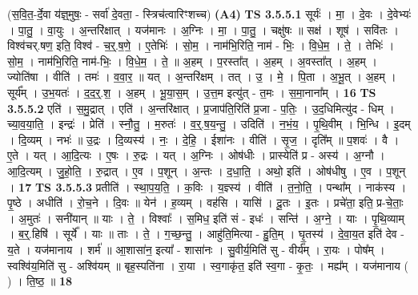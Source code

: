 \documentclass[17pt]{extarticle}
\begin{document}
                  \newline
                      (स॒वि॒त॒-र्दे॒वा य॑ज्ञ्॒मुषः॒ - सर्वा॑ दे॒वता॒ - स्त्रिच॑त्वारिꣳशच्च)  \textbf{(A4)} \newline \newline
                                \textbf{ TS 3.5.5.1} \newline
                  सूर्यः॑ । मा॒ । दे॒वः । दे॒वेभ्यः॑ । पा॒तु॒ । वा॒युः । अ॒न्तरि॑क्षात् । यज॑मानः । अ॒ग्निः । मा॒ । पा॒तु॒ । चक्षु॑षः ॥ सक्ष॑ । शूष॑ । सवि॑तः । विश्व॑चर्.षण॒ इति॒ विश्व॑ - च॒र्॒.ष॒णे॒ । ए॒तेभिः॑ । सो॒म॒ । नाम॑भि॒रिति॒ नाम॑ - भिः॒ । वि॒धे॒म॒ । ते॒ । तेभिः॑ । सो॒म॒ । नाम॑भि॒रिति॒ नाम॑-भिः॒ । वि॒धे॒म॒ । ते॒ ॥ अ॒हम् । प॒रस्ता᳚त् । अ॒हम् । अ॒वस्ता᳚त् । अ॒हम् । ज्योति॑षा । वीति॑ । तमः॑ । व॒वा॒र॒ ॥ यत् । अ॒न्तरि॑क्षम् । तत् । उ॒ । मे॒ । पि॒ता । अ॒भू॒त् । अ॒हम् । सूर्य᳚म् । उ॒भ॒यतः॑ । द॒द॒र्॒.श॒ । अ॒हम् । भू॒या॒स॒म् । उ॒त्त॒म इत्यु॑त् - त॒मः । स॒मा॒नाना᳚म् । \textbf{  16} \newline
                  \newline
                                \textbf{ TS 3.5.5.2} \newline
                  एति॑ । स॒मु॒द्रात् । एति॑ । अ॒न्तरि॑क्षात् । प्र॒जाप॑ति॒रिति॑ प्र॒जा - प॒तिः॒ । उ॒द॒धिमित्यु॑द - धिम् । च्या॒व॒या॒ति॒ । इन्द्रः॑ । प्रेति॑ । स्नौ॒तु॒ । म॒रुतः॑ । व॒र्॒.ष॒य॒न्तु॒ । उदिति॑ । न॒भं॒य॒ । पृ॒थि॒वीम् । भि॒न्धि । इ॒दम् । दि॒व्यम् । नभः॑ ॥ उ॒द्रः । दि॒व्यस्य॑ । नः॒ । दे॒हि॒ । ईशा॑नः । वीति॑ । सृ॒ज॒ । दृति᳚म् ॥ प॒शवः॑ । वै । ए॒ते । यत् । आ॒दि॒त्यः । ए॒षः । रु॒द्रः । यत् । अ॒ग्निः । ओष॑धीः । प्रास्येति॑ प्र - अस्य॑ । अ॒ग्नौ । आ॒दि॒त्यम् । जु॒हो॒ति॒ । रु॒द्रात् । ए॒व । प॒शून् । अ॒न्तः । द॒धा॒ति॒ । अथो॒ इति॑ । ओष॑धीषु । ए॒व । प॒शून् । \textbf{  17} \newline
                  \newline
                                \textbf{ TS 3.5.5.3} \newline
                  प्रतीति॑ । स्था॒प॒य॒ति॒ । क॒विः । य॒ज्ञ्स्य॑ । वीति॑ । त॒नो॒ति॒ । पन्था᳚म् । नाक॑स्य । पृ॒ष्ठे । अधीति॑ । रो॒च॒ने । दि॒वः ॥ येन॑ । ह॒व्यम् । वह॑सि । यासि॑ । दू॒तः । इ॒तः । प्रचे॑ता॒ इति॒ प्र-चे॒ताः॒ । अ॒मुतः॑ । सनी॑यान् ॥ याः । ते॒ । विश्वाः᳚ । स॒मिध॒ इति॑ सं - इधः॑ । सन्ति॑ । अ॒ग्ने॒ । याः । पृ॒थि॒व्याम् । ब॒र्॒.हिषि॑ । सूर्ये᳚ । याः ॥ ताः । ते॒ । ग॒च्छ॒न्तु॒ । आहु॑ति॒मित्या - हु॒ति॒म् । घृ॒तस्य॑ । दे॒वा॒य॒त इति॑ देव - य॒ते । यज॑मानाय । शर्म॑ ॥ आ॒शासा॑न॒ इत्या᳚ - शासा॑नः । सु॒वीर्य॒मिति॑ सु - वीर्य᳚म् । रा॒यः । पोष᳚म् । स्वश्वि॑य॒मिति॑ सु - अश्वि॑यम् ॥ बृह॒स्पति॑ना । रा॒या । स्व॒गाकृ॑त॒ इति॑ स्व॒गा - कृ॒तः॒ । मह्य᳚म् । यज॑मानाय ( ) । ति॒ष्ठ॒ ॥ \textbf{  18} \newline
\end{document}
